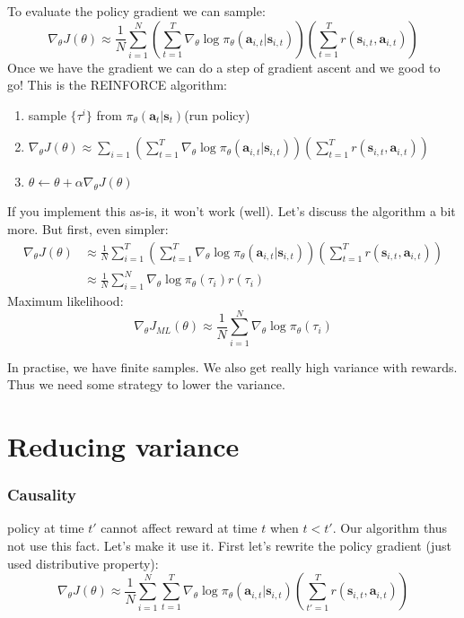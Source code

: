 \documentclass{report}
\begin{document}
To evaluate the policy gradient we can sample:
\begin{equation}
		\nabla_\theta J(\theta) \approx \frac{1}{N}  \sum_{i=1}^{N} 
		\left ( \sum_{t=1}^{T} \nabla_\theta \log \pi_\theta (\bm{a}_{i,t} | \bm{s}_{i,t} ) \right )
		\left ( \sum_{t=1}^{T} r(\bm{s}_{i,t}, \bm{a}_{i,t}) \right )
\end{equation}
Once we have the gradient we can do a step of gradient ascent and we good to go!
This is the REINFORCE algorithm:
\begin{enumerate}
		\item sample $\{\tau^i\}$ from $\pi_\theta(\bm{a}_t | \bm{s}_t)$(run policy)
		\item $\nabla_\theta J(\theta) \approx   \sum_{i=1}^{} 
		\left ( \sum_{t=1}^{T} \nabla_\theta \log \pi_\theta (\bm{a}_{i,t} | \bm{s}_{i,t} ) \right )
		\left ( \sum_{t=1}^{T} r(\bm{s}_{i,t}, \bm{a}_{i,t}) \right )$
\item $\theta \leftarrow \theta + \alpha \nabla_\theta J(\theta) $
\end{enumerate}


If you implement this as-is, it won't work (well).
Let's discuss the algorithm a bit more.
But first, even simpler:
\begin{align}
		\nabla_\theta J(\theta) &\approx \frac{1}{N}  \sum_{i=1}^{T} 
		\left ( \sum_{t=1}^{T} \nabla_\theta \log \pi_\theta (\bm{a}_{i,t} | \bm{s}_{i,t} ) \right )
		\left ( \sum_{t=1}^{T} r(\bm{s}_{i,t}, \bm{a}_{i,t}) \right ) \\
		&\approx \frac{1}{N} \sum_{i=1}^{N} \nabla_\theta \log \pi_\theta (\tau_i)r(\tau_i)
\end{align}
Maximum likelihood:
\begin{equation}
		\nabla_\theta J_{ML}(\theta) \approx \frac{1}{N} \sum_{i=1}^{N} \nabla_\theta \log \pi_\theta (\tau_i) 
\end{equation}

In practise, we have finite samples. We also get really high variance with rewards.
Thus we need some strategy to lower the variance.

\section{Reducing variance}
\subsubsection{Causality} policy at time $t'$ cannot affect reward at time $t$ when $t<t'$.
Our algorithm thus not use this fact. Let's make it use it.
First let's rewrite the policy gradient (just used distributive property):
\begin{equation}
		\nabla_\theta J(\theta) \approx 
		\frac{1}{N} \sum_{i=1}^{N} \sum_{t=1}^{T} \nabla_\theta \log \pi_\theta (\bm{a}_{i,t}| \bm{s}_{i,t})
		\left ( \sum_{t'=1}^{T} r (\bm{s}_{i,t}, \bm{a}_{i,t}) \right )
\end{equation}
\end{document}

